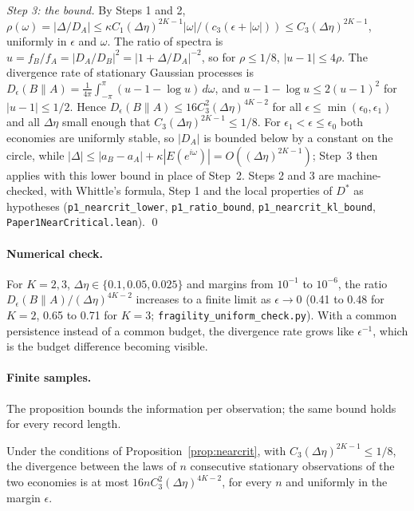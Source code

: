 \emph{Step 3: the bound.} By Steps 1 and 2, $\rho(\omega)=|\Delta/D_A|\le\kappa C_1(\Delta\eta)^{2K-1}|\omega|/(c_3(\epsilon+|\omega|))\le C_3(\Delta\eta)^{2K-1}$, uniformly in $\epsilon$ and $\omega$. The ratio of spectra is $u=f_B/f_A=|D_A/D_B|^2=|1+\Delta/D_A|^{-2}$, so for $\rho\le1/8$, $|u-1|\le4\rho$. The divergence rate of stationary Gaussian processes is $D_\epsilon(B\|A)=\frac1{4\pi}\int_{-\pi}^{\pi}(u-1-\log u)\,d\omega$, and $u-1-\log u\le2(u-1)^2$ for $|u-1|\le1/2$. Hence $D_\epsilon(B\|A)\le16C_3^2(\Delta\eta)^{4K-2}$ for all $\epsilon\le\min(\epsilon_0,\epsilon_1)$ and all $\Delta\eta$ small enough that $C_3(\Delta\eta)^{2K-1}\le1/8$. For $\epsilon_1<\epsilon\le\epsilon_0$ both economies are uniformly stable, so $|D_A|$ is bounded below by a constant on the circle, while $|\Delta|\le|a_B-a_A|+\kappa|E(e^{i\omega})|=O((\Delta\eta)^{2K-1})$; Step~3 then applies with this lower bound in place of Step~2. Steps 2 and 3 are machine-checked, with Whittle's formula, Step 1 and the local properties of $D^*$ as hypotheses (\texttt{p1\_nearcrit\_lower}, \texttt{p1\_ratio\_bound}, \texttt{p1\_nearcrit\_kl\_bound}, \nolinkurl{Paper1NearCritical.lean}). \qed

\paragraph{Numerical check.} For $K=2,3$, $\Delta\eta\in\{0.1,0.05,0.025\}$ and margins from $10^{-1}$ to $10^{-6}$, the ratio $D_\epsilon(B\|A)/(\Delta\eta)^{4K-2}$ increases to a finite limit as $\epsilon\to0$ (0.41 to 0.48 for $K=2$, 0.65 to 0.71 for $K=3$; \nolinkurl{fragility_uniform_check.py}). With a common persistence instead of a common budget, the divergence rate grows like $\epsilon^{-1}$, which is the budget difference becoming visible.


\paragraph{Finite samples.} The proposition bounds the information per observation; the same bound holds for every record length.

\begin{proposition}\label{prop:nearcritn}
Under the conditions of Proposition~\ref{prop:nearcrit}, with $C_3(\Delta\eta)^{2K-1}\le1/8$, the divergence between the laws of $n$ consecutive stationary observations of the two economies is at most $16nC_3^2(\Delta\eta)^{4K-2}$, for every $n$ and uniformly in the margin $\epsilon$.
\end{proposition}

